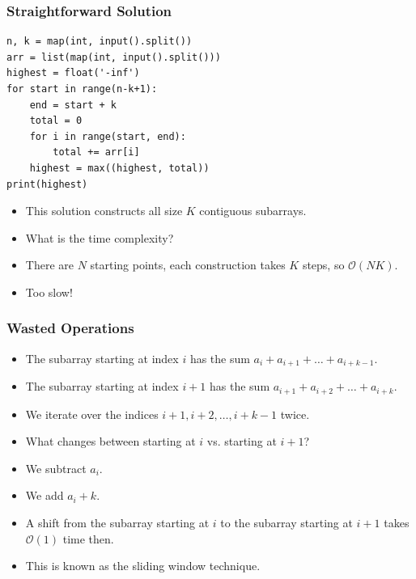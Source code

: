 \documentclass{beamer}
\begin{document}
\begin{frame}
    \frametitle{Straightforward Solution}
	\begin{scriptsize}
        \begin{verbatim}
n, k = map(int, input().split())
arr = list(map(int, input().split()))
highest = float('-inf')
for start in range(n-k+1):
    end = start + k
    total = 0
    for i in range(start, end):
        total += arr[i]
    highest = max((highest, total))
print(highest)
        \end{verbatim}
    \end{scriptsize}
    \begin{itemize}
        \item<2-> This solution constructs all size $K$ contiguous subarrays.
        \item<3-> What is the time complexity?
        \item<4-> There are $N$ starting points, each construction takes $K$ steps, so $\mathcal{O}(NK)$.
        \item<5-> Too slow!
    \end{itemize}
\end{frame}

\begin{frame}
    \frametitle{Wasted Operations}
    \begin{itemize}
        \item<1-> The subarray starting at index $i$ has the sum $a_i + a_{i+1} + \dots + a_{i+k-1}$.
        \item<2-> The subarray starting at index $i+1$ has the sum $a_{i+1} + a_{i+2} + \dots + a_{i+k}$.
        \item<3-> We iterate over the indices $i+1, i+2, \dotsc, i+k-1$ twice.
        \item<4-> What changes between starting at $i$ vs. starting at $i+1$?
        \item<5-> We subtract $a_i$.
        \item<6-> We add $a_i+k$.
        \item<7-> A shift from the subarray starting at $i$ to the subarray starting at $i+1$ takes $\mathcal{O}(1)$ time then.
        \item<8-> This is known as the sliding window technique.
    \end{itemize}
\end{frame}
\end{document}
